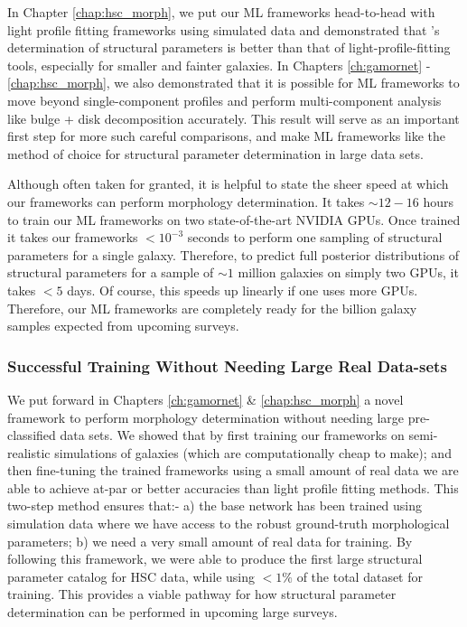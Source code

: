 In Chapter \ref{chap:hsc_morph}, we put our ML frameworks head-to-head with light profile fitting frameworks using simulated data and demonstrated that \gampen{}'s determination of structural parameters is better than that of light-profile-fitting tools, especially for smaller and fainter galaxies. In Chapters \ref{ch:gamornet} - \ref{chap:hsc_morph}, we also demonstrated that it is possible for ML frameworks to move beyond single-component \sersic{} profiles and perform multi-component analysis like bulge + disk decomposition accurately. This result will serve as an important first step for more such careful comparisons, and make ML frameworks like \gampen{} the method of choice for structural parameter determination in large data sets.

 
Although often taken for granted, it is helpful to state the sheer speed at which our frameworks can perform morphology determination. It takes $\sim12-16$ hours to train our ML frameworks on two state-of-the-art NVIDIA GPUs. Once trained it takes our frameworks $<10^{-3}$ seconds to perform one sampling of structural parameters for a single galaxy. Therefore, to predict full posterior distributions of structural parameters for a sample of $\sim1$ million galaxies on simply two GPUs, it takes $<5$ days. Of course, this speeds up linearly if one uses more GPUs. Therefore, our ML frameworks are completely ready for the billion galaxy samples expected from upcoming surveys.


\subsubsection{Successful Training Without Needing Large Real Data-sets}
We put forward in Chapters \ref{ch:gamornet} \& \ref{chap:hsc_morph} a novel framework to perform morphology determination without needing large pre-classified data sets. We showed that by first training our frameworks on semi-realistic simulations of galaxies (which are computationally cheap to make); and then fine-tuning the trained frameworks using a small amount of real data we are able to achieve at-par or better accuracies than light profile fitting methods. This two-step method ensures that:- a) the base network has been trained using simulation data where we have access to the robust ground-truth morphological parameters; b) we need a very small amount of real data for training. By following this framework, we were able to produce the first large structural parameter catalog for HSC data, while using $<1\%$ of the total dataset for training. This provides a viable pathway for how structural parameter determination can be performed in upcoming large surveys.  

